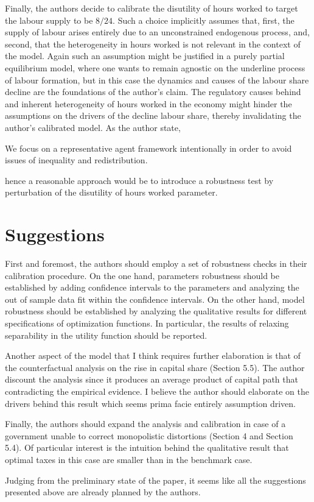\documentclass[american]{scrartcl}
\begin{document}
Finally, the authors decide to calibrate the disutility of hours worked to target the labour supply to be $8/24$. Such a choice implicitly assumes that, first, the supply of labour arises entirely due to an unconstrained endogenous process, and, second, that the heterogeneity in hours worked is not relevant in the context of the model. Again such an assumption might be justified in a purely partial equilibrium model, where one wants to remain agnostic on the underline process of labour formation, but in this case the dynamics and causes of the labour share decline are the foundations of the author's claim. The regulatory causes behind and inherent heterogeneity of hours worked in the economy might hinder the assumptions on the drivers of the decline labour share, thereby invalidating the author's calibrated model. As the author state,

\begin{displayquote}[p. 3][]
    We focus on a representative agent framework intentionally in order to avoid issues of inequality and redistribution.
\end{displayquote}

hence a reasonable approach would be to introduce a robustness test by perturbation of the disutility of hours worked parameter.

\section{Suggestions}

First and foremost, the authors should employ a set of robustness checks in their calibration procedure. On the one hand, parameters robustness should be established by adding confidence intervals to the parameters and analyzing the out of sample data fit within the confidence intervals. On the other hand, model robustness should be established by analyzing the qualitative results for different specifications of optimization functions. In particular, the results of relaxing separability in the utility function should be reported.

Another aspect of the model that I think requires further elaboration is that of the counterfactual analysis on the rise in capital share (Section 5.5). The author discount the analysis since it produces an average product of capital path that contradicting the empirical evidence. I believe the author should elaborate on the drivers behind this result which seems prima facie entirely assumption driven.

Finally, the authors should expand the analysis and calibration in case of a government unable to correct monopolistic distortions (Section 4 and Section 5.4). Of particular interest is the intuition behind the qualitative result that optimal taxes in this case are smaller than in the benchmark case.

Judging from the preliminary state of the paper, it seems like all the suggestions presented above are already planned by the authors.

\newpage
\nocite{*}
\printbibliography
\end{document}
